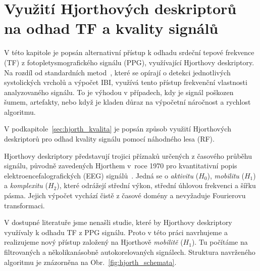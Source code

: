 
\chapter{Využití Hjorthových deskriptorů na odhad TF a kvality signálů}
\label{ch:hjorth}
V této kapitole je popsán alternativní přístup k odhadu srdeční tepové frekvence (\acs{TF}) z fotopletysmografického signálu (\acs{PPG}), využívající Hjorthovy deskriptory.
Na rozdíl od standardních metod~\cite{ENIKÖ,Charlton2022,NeuroKit2}, které se opírají o detekci jednotlivých systolických vrcholů a výpočet \acs{IBI}, využívá tento přístup frekvenční vlastnosti analyzovaného signálu.
To je výhodou v případech, kdy je signál poškozen šumem, artefakty, nebo když je kladen důraz na výpočetní náročnost a rychlost algoritmu.

V podkapitole~\ref{sec:hjorth_kvalita} je popsán způsob využití Hjorthových deskriptorů pro odhad kvality signálu pomocí náhodného lesa (\acs{RF}).

Hjorthovy deskriptory představují trojici příznaků určených z časového průběhu signálu, původně zavedených Hjorthem v~roce 1970 pro kvantitativní popis elektroencefalografických (\acs{EEG}) signálů~\cite{Hjorth1970,Hjorth1973}.
Jedná se o \textit{aktivitu} (\(H_0\)), \textit{mobilitu} (\(H_1\)) a \textit{komplexitu} (\(H_2\)), které odrážejí střední výkon, střední úhlovou frekvenci a šířku pásma.
Jejich výpočet vychází čistě z časové domény a nevyžaduje Fourierovu transformaci.

V dostupné literatuře jsme nenašli studie, které by Hjorthovy deskriptory využívaly k odhadu \acs{TF} z \acs{PPG} signálu.
Proto v této práci navrhujeme a realizujeme nový přístup založený na Hjorthově \textit{mobilitě} (\(H_1\)).
Tu počítáme na filtrovaných a několikanásobně autokorelovaných signálech.
Struktura navrženého algoritmu je znázorněna na Obr.~\ref{fig:hjorth_schemata}.


